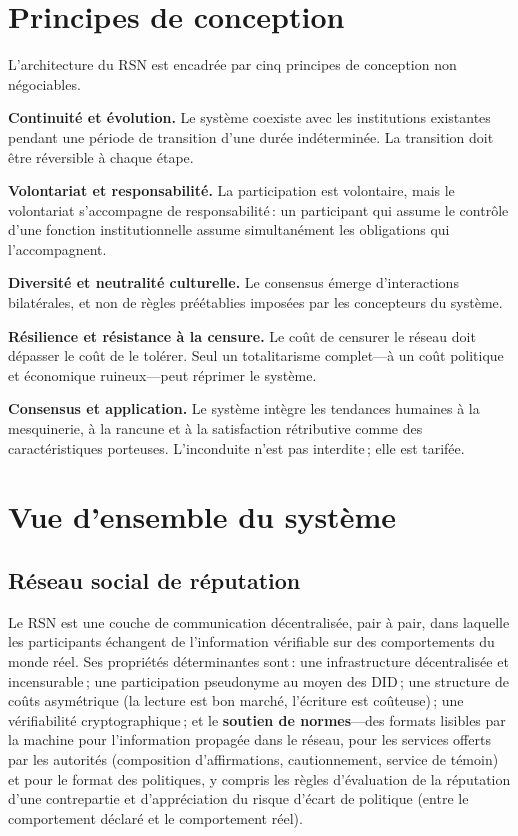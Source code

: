 \documentclass[11pt,a4paper,twocolumn]{article}
\begin{document}
\section{Principes de conception}

L'architecture du RSN est encadrée par cinq principes de conception non négociables.

\textbf{Continuité et évolution.} Le système coexiste avec les institutions existantes pendant une période de transition d'une durée indéterminée. La transition doit être réversible à chaque étape.

\textbf{Volontariat et responsabilité.} La participation est volontaire, mais le volontariat s'accompagne de responsabilité\,: un participant qui assume le contrôle d'une fonction institutionnelle assume simultanément les obligations qui l'accompagnent.

\textbf{Diversité et neutralité culturelle.} Le consensus émerge d'interactions bilatérales, et non de règles préétablies imposées par les concepteurs du système.

\textbf{Résilience et résistance à la censure.} Le coût de censurer le réseau doit dépasser le coût de le tolérer. Seul un totalitarisme complet---à un coût politique et économique ruineux---peut réprimer le système.

\textbf{Consensus et application.} Le système intègre les tendances humaines à la mesquinerie, à la rancune et à la satisfaction rétributive comme des caractéristiques porteuses. L'inconduite n'est pas interdite\,; elle est tarifée.

\section{Vue d'ensemble du système}

\subsection{Réseau social de réputation}

Le RSN est une couche de communication décentralisée, pair à pair, dans laquelle les participants échangent de l'information vérifiable sur des comportements du monde réel. Ses propriétés déterminantes sont\,: une infrastructure décentralisée et incensurable\,; une participation pseudonyme au moyen des DID\,; une structure de coûts asymétrique (la lecture est bon marché, l'écriture est coûteuse)\,; une vérifiabilité cryptographique\,; et le \textbf{soutien de normes}---des formats lisibles par la machine pour l'information propagée dans le réseau, pour les services offerts par les autorités (composition d'affirmations, cautionnement, service de témoin) et pour le format des politiques, y compris les règles d'évaluation de la réputation d'une contrepartie et d'appréciation du risque d'écart de politique (entre le comportement déclaré et le comportement réel).
\end{document}
